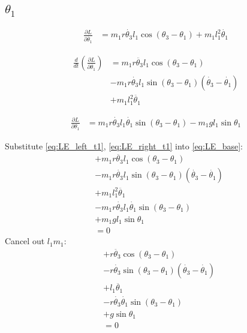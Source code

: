 \documentclass[titlepage]{article}
\numberwithin{equation}{section}
\begin{document}
\subsection{$\theta_1$}
\begin{align}
\frac{\partial L}{\partial \dot{\theta_1}} &= m_1 r \dot{\theta_3} l_1 \cos{(\theta_3 - \theta_1)} + m_1 l_1^2 \dot{\theta_1}
\end{align}

\begin{align}
\frac{d}{dt} \left(\frac{\partial L}{\partial \dot{\theta_1}}\right) &= m_1 r \ddot{\theta_3} l_1 \cos{(\theta_3 - \theta_1)} \nonumber \\
 &- m_1 r \dot{\theta_3} l_1 \sin{(\theta_3 - \theta_1)} (\dot{\theta_3} - \dot{\theta_1}) \nonumber \\
 &+ m_1 l_1^2 \ddot{\theta_1} \label{eq:LE_left_t1}
\end{align}

\begin{align}
\frac{\partial L}{\partial \theta_1} &= m_1 r \dot{\theta_3} l_1 \dot{\theta_1} \sin{(\theta_3 - \theta_1)} - m_1 g l_1 \sin \theta_1 \label{eq:LE_right_t1}
\end{align}

\bigskip
\noindent
Substitute \ref{eq:LE_left_t1}, \ref{eq:LE_right_t1} into \ref{eq:LE_base}:
\begin{align}
 &+ m_1 r \ddot{\theta_3} l_1 \cos{(\theta_3 - \theta_1)} \nonumber \\
 &- m_1 r \dot{\theta_3} l_1 \sin{(\theta_3 - \theta_1)} (\dot{\theta_3} - \dot{\theta_1}) \nonumber \\
 &+ m_1 l_1^2 \ddot{\theta_1} \nonumber \\
 &- m_1 r \dot{\theta_3} l_1 \dot{\theta_1} \sin{(\theta_3 - \theta_1)} \nonumber \\
 &+ m_1 g l_1 \sin \theta_1 \nonumber \\
 &= 0
\end{align}
Cancel out $l_1 m_1$:
\begin{align}
 &+ r \ddot{\theta_3} \cos{(\theta_3 - \theta_1)} \nonumber \\
 &- r \dot{\theta_3} \sin{(\theta_3 - \theta_1)} (\dot{\theta_3} - \dot{\theta_1}) \nonumber \\
 &+ l_1 \ddot{\theta_1} \nonumber \\
 &- r \dot{\theta_3} \dot{\theta_1} \sin{(\theta_3 - \theta_1)} \nonumber \\
 &+ g \sin \theta_1 \nonumber \\
 &= 0
\end{align}
\end{document}
